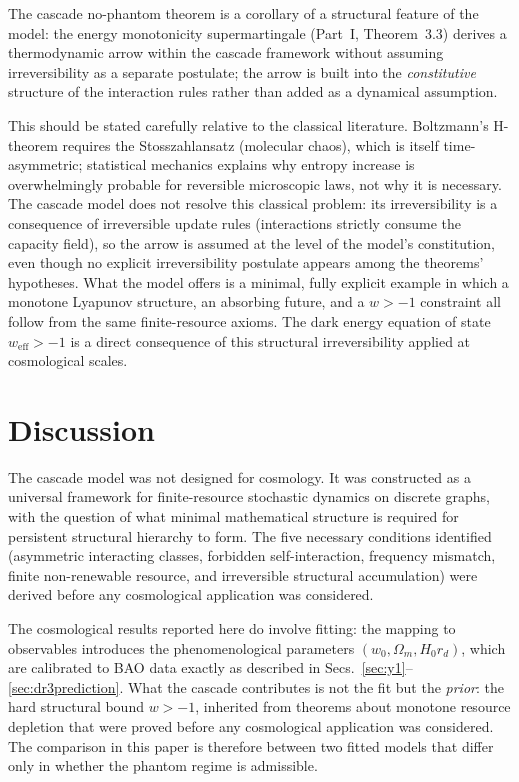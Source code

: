 \documentclass[12pt,a4paper]{article}
\theoremstyle{plain}
\theoremstyle{definition}
\newcommand{\weff}{w_{\mathrm{eff}}}
\begin{document}
The cascade no-phantom theorem is a corollary of a structural feature of the
model: the energy monotonicity supermartingale (Part~I, Theorem~3.3) derives a
thermodynamic arrow within the cascade framework without assuming
irreversibility as a separate postulate; the arrow is built into the
\emph{constitutive} structure of the interaction rules rather than added as a
dynamical assumption.

This should be stated carefully relative to the classical literature.
Boltzmann's H-theorem requires the Stosszahlansatz (molecular chaos), which is
itself time-asymmetric; statistical mechanics explains why entropy increase is
overwhelmingly probable for reversible microscopic laws, not why it is
necessary. The cascade model does not resolve this classical problem: its
irreversibility is a consequence of irreversible update rules (interactions
strictly consume the capacity field), so the arrow is assumed at the level of
the model's constitution, even though no explicit irreversibility postulate
appears among the theorems' hypotheses. What the model offers is a minimal,
fully explicit example in which a monotone Lyapunov structure, an absorbing
future, and a $w > -1$ constraint all follow from the same finite-resource
axioms. The dark energy equation of state $\weff > -1$ is a direct consequence
of this structural irreversibility applied at cosmological scales.

\section{Discussion}
\label{sec:discussion}

The cascade model was not designed for cosmology. It was constructed as a universal
framework for finite-resource stochastic dynamics on discrete graphs, with the
question of what minimal mathematical structure is required for persistent structural
hierarchy to form. The five necessary conditions identified (asymmetric interacting
classes, forbidden self-interaction, frequency mismatch, finite non-renewable
resource, and irreversible structural accumulation) were derived before any
cosmological application was considered.

The cosmological results reported here do involve fitting: the mapping to
observables introduces the phenomenological parameters $(w_0, \Omega_m, H_0 r_d)$,
which are calibrated to BAO data exactly as described in
Secs.~\ref{sec:y1}--\ref{sec:dr3prediction}. What the cascade contributes is not the fit but the
\emph{prior}: the hard structural bound $w > -1$, inherited from theorems about
monotone resource depletion that were proved before any cosmological application
was considered. The comparison in this paper is therefore between two fitted
models that differ only in whether the phantom regime is admissible.
\end{document}

